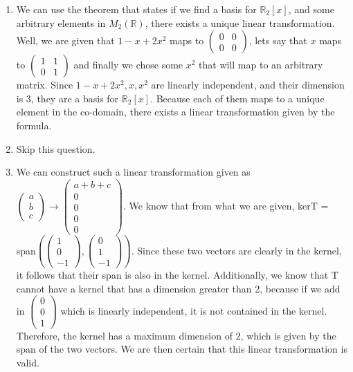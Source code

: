 \documentclass{article}
\begin{document}
\begin{enumerate}
\begin{enumerate}
\item We can use the theorem that states if we find a basis for $\mathbb{R}_2[x]$, and some arbitrary elements in $M_2(\mathbb{R})$, there exists a unique linear transformation. Well, we are given that $1 -x + 2x^2$ maps to $\left(\begin{array}{cc} 0 & 0 \\ 0 & 0 \end{array}\right)$, lets say that $x$ maps to $\left(\begin{array}{cc} 1 & 1 \\ 0 & 1 \end{array}\right)$ and finally we chose some $x^2$ that will map to an arbitrary matrix. Since $1 - x + 2x^2, x, x^2$ are linearly independent, and their dimension is 3, they are a basis for $\mathbb{R}_2[x]$. Because each of them maps to a unique element in the co-domain, there exists a linear transformation given by the formula.

\item Skip this question.

\item We can construct such a linear transformation given as $\left(\begin{array}{c} a \\ b \\ c \end{array}\right) \rightarrow \left(\begin{array}{c} a + b + c \\ 0 \\ 0 \\ 0 \\ 0 \end{array}\right)$. We know that from what we are given, kerT = span$\left(\left(\begin{array}{c}1 \\ 0 \\ -1 \end{array}\right), \left(\begin{array}{c} 0 \\ 1 \\ -1 \end{array}\right)\right)$. Since these two vectors are clearly in the kernel, it follows that their span is also in the kernel. Additionally, we know that T cannot have a kernel that has a dimension greater than 2, because if we add in $\left(\begin{array}{c} 0 \\ 0 \\ 1 \end{array}\right)$ which is linearly independent, it is not contained in the kernel. Therefore, the kernel has a maximum dimension of 2, which is given by the span of the two vectors. We are then certain that this linear transformation is valid.


\end{enumerate}
\end{enumerate}
\end{document}
